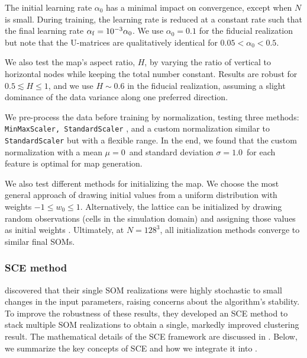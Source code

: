 The initial learning rate $\alpha_0$ has a minimal impact on convergence, except when $N$ is small. During training, the learning rate is reduced at a constant rate such that the final learning rate $\alpha_{\rm f} = 10^{-3} \alpha_0$.
We use $\alpha_0 = 0.1$ for the fiducial realization but note that the U-matrices are qualitatively identical for $0.05 < \alpha_0 < 0.5$.

We also test the map's aspect ratio, $H$, by varying the ratio of vertical to horizontal nodes while keeping the total number constant.
Results are robust for $0.5 \lesssim H \leq 1$, and we use $H \sim 0.6$ in the fiducial realization, assuming a slight dominance of the data variance along one preferred direction.

We pre-process the data before training by normalization, testing three methods: \texttt{MinMaxScaler, StandardScaler} \citep{pedregosa_scikit-learn_2011}, and a custom normalization similar to \texttt{StandardScaler} but with a flexible range.
In the end, we found that the custom normalization with a mean $\mu = 0$~and standard deviation $\sigma = 1.0$~for each feature is optimal for map generation.

We also test different methods for initializing the map.
We choose the most general approach of drawing initial values from a uniform distribution with weights $-1 \leq w_0 \leq 1$.
Alternatively, the lattice can be initialized by drawing random observations (cells in the simulation domain) and assigning those values as initial weights \citep{ponmalai_self-organizing_2019}.
Ultimately, at $N = 128^3$, all initialization methods converge to similar final SOMs.

\subsubsection{SCE method} \label{app:sce}
\citet{bussov_maarja_segmentation_2021} discovered that their single SOM realizations were highly stochastic to small changes in the input parameters, raising concerns about the algorithm's stability.
To improve the robustness of these results, they developed an SCE method to stack multiple SOM realizations to obtain a single, markedly improved clustering result.
The mathematical details of the SCE framework are discussed in \citet{bussov_maarja_segmentation_2021}.
Below, we summarize the key concepts of SCE and how we integrate it into \awesom.

